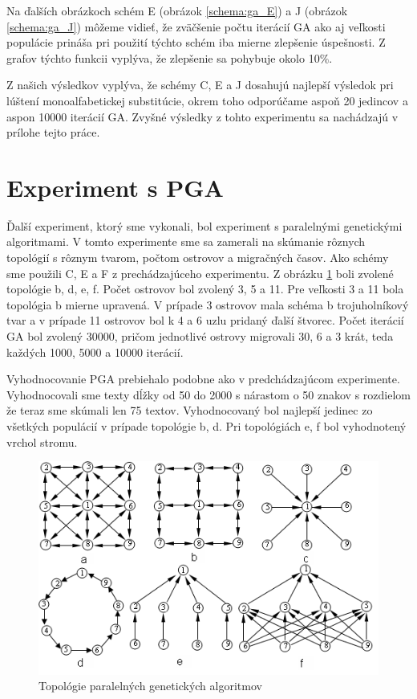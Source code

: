Na ďalších obrázkoch schém E (obrázok \ref{schema:ga_E}) a J (obrázok \ref{schema:ga_J}) môžeme vidieť, že zväčšenie počtu iterácií GA ako aj veľkosti populácie prináša pri použití týchto schém iba mierne zlepšenie úspešnosti. Z grafov týchto funkcii vyplýva, že zlepšenie sa pohybuje okolo 10\%.

Z našich výsledkov vyplýva, že schémy C, E a J dosahujú najlepší výsledok pri lúštení monoalfabetickej substitúcie, okrem toho odporúčame aspoň 20 jedincov a aspon 10000 iterácií GA. Zvyšné výsledky z tohto experimentu sa nachádzajú v prílohe tejto práce.




\clearpage
\section{Experiment s PGA}
Ďalší experiment, ktorý sme vykonali, bol experiment s paralelnými genetickými algoritmami.
V tomto experimente sme sa zamerali na skúmanie rôznych topológií s rôznym tvarom, počtom ostrovov a migračných časov. Ako schémy sme použili C, E a F z prechádzajúceho experimentu.
Z obrázku \ref{img:topology} boli zvolené topológie b, d, e, f. Počet ostrovov bol zvolený 3, 5 a 11. Pre veľkosti 3 a 11 bola topológia b mierne upravená.
V prípade 3 ostrovov mala schéma b trojuholníkový tvar a v prípade 11 ostrovov bol k 4 a 6 uzlu pridaný ďalší štvorec.
Počet iterácií GA bol zvolený 30000, pričom jednotlivé ostrovy migrovali 30, 6 a 3 krát, teda každých 1000, 5000 a 10000 iterácií.

Vyhodnocovanie PGA prebiehalo podobne ako v predchádzajúcom experimente. Vyhodnocovali sme texty dĺžky od 50 do 2000 s nárastom o 50 znakov s rozdielom že teraz sme skúmali len 75 textov. Vyhodnocovaný bol najlepší jedinec zo všetkých populácií v prípade topológie b, d. Pri topológiách e, f bol vyhodnotený vrchol stromu. 
\begin{figure}[!htbp]
  \centering
  \includegraphics[width=\textwidth]{img/topology.png}
  \caption{Topológie paralelných genetických algoritmov \cite{pea}}
  \label{img:topology}
\end{figure}

